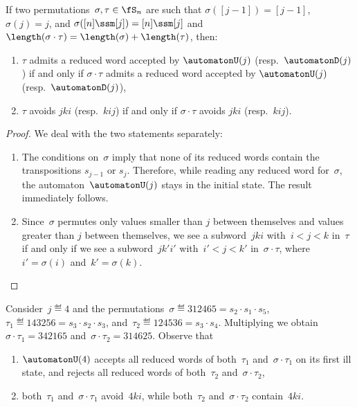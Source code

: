 \begin{lemma}\label{lem:vincent2}
If two permutations~$\sigma, \tau \in \fS_n$ are such that $\sigma([j-1]) = [j-1]$, $\sigma(j) = j$, and $\sigma([n]\ssm [j]) = [n]\ssm [j]$ and $\length(\sigma \cdot \tau) = \length(\sigma) + \length(\tau)$, then:
\begin{enumerate}
	\item $\tau$ admits a reduced word accepted by $\automatonU(j)$ (resp.~$\automatonD(j)$) if and only if $\sigma \cdot \tau$ admits a reduced word accepted by $\automatonU(j)$ (resp.~$\automatonD(j)$),
	\item $\tau$ avoids $jki$ (resp.~$kij$) if and only if $\sigma \cdot \tau$ avoids $jki$ (resp.~$kij$).
\end{enumerate}
\end{lemma}

\begin{proof}
We deal with the two statements separately:
\begin{enumerate} 
	\item The conditions on~$\sigma$ imply that none of its reduced words contain the transpositions $s_{j-1}$ or $s_j$. Therefore, while reading any reduced word for~$\sigma$, the automaton~$\automatonU(j)$ stays in the initial state. The result immediately follows.
	\item Since~$\sigma$ permutes only values smaller than $j$ between themselves and values greater than $j$ between themselves, we see a subword~$jki$ with~$i < j < k$ in~$\tau$ if and only if we see a subword~$jk'i'$ with~$i' < j < k'$ in~$\sigma \cdot \tau$, where~$i' = \sigma(i)$ and~$k' = \sigma(k)$.
	\qedhere
\end{enumerate}
\end{proof}

\begin{example}\label{exm:lemVincent2}
Consider~$j \eqdef 4$ and the permutations~$\sigma \eqdef 312465 = s_2 \cdot s_1 \cdot s_5$, $\tau_1 \eqdef 143256 = s_3 \cdot s_2 \cdot s_3$, and~$\tau_2 \eqdef 124536 = s_3 \cdot s_4$.
Multiplying we obtain~$\sigma\cdot\tau_1=342165$ and~$\sigma\cdot\tau_2 = 314625$. Observe that
\begin{enumerate}
	\item $\automatonU(4)$ accepts all reduced words of both~$\tau_1$ and~$\sigma\cdot \tau_1$ on its first ill state, and rejects all reduced words of both~$\tau_2$ and~$\sigma\cdot \tau_2$,
	\item both~$\tau_1$ and~$\sigma\cdot\tau_1$ avoid~$4ki$, while both~$\tau_2$ and~$\sigma\cdot\tau_2$ contain~$4ki$.
\end{enumerate}
\end{example}


